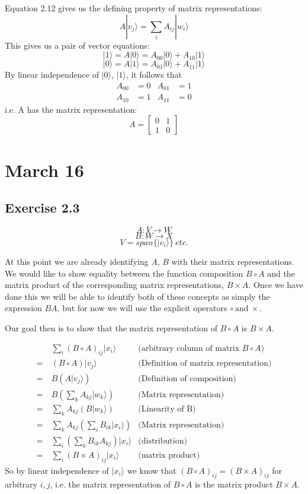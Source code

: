 \documentclass[]{article}
\begin{document}
Equation 2.12 gives us the defining property of matrix representations:
\[A|v_j\rangle=\sum_i A_{ij}|w_i\rangle\]
This gives us a pair of vector equations:
\[
|1\rangle = A|0\rangle = A_{00}|0\rangle + A_{10}|1\rangle
\]
\[
|0\rangle = A|1\rangle = A_{01}|0\rangle + A_{11}|1\rangle
\]
By linear independence of $|0\rangle$, $|1\rangle$, it follows that
\begin{align*}
A_{00} &= 0 & A_{01} &= 1 \\
A_{10} &= 1 & A_{11} &= 0
\end{align*}
i.e. A has the matrix representation:
\[
A = \left[\begin{matrix}
0 & 1 \\
1 & 0
\end{matrix}\right]
\]

\section{March 16}

\subsection{Exercise 2.3}
\[
A: V \to W
\]\[
B: W \to X
\]\[
V = span\{|v_i\rangle\}\ \textit{etc.}
\]

At this point we are already identifying $A$, $B$ with their matrix representations. We would like to show equality between the function composition $B \circ A$ and the matrix product of the corresponding matrix representations, $B \times A$.
Once we have done this we will be able to identify both of these concepts as simply the expression $BA$, but for now we will use the explicit operators
$\circ\ \text{and}\ \times$.

Our goal then is to show that the matrix representation of $B \circ A$ is $B \times A$.

\begin{align*}
&\sum_i (B \circ A)_{ij} |x_i\rangle &\text{(arbitrary column of matrix $B \circ A$)}\\
=\ &(B \circ A)|v_j\rangle &\text{(Definition of matrix representation)}\\
=\ &B(A|v_j\rangle) &\text{(Definition of composition)}\\
=\ &B\left(\sum_k A_{kj} |w_k\rangle\right) &\text{(Matrix representation)}\\
=\ &\sum_k A_{kj} (B |w_k\rangle) &\text{(Linearity of B)}\\
=\ &\sum_k A_{kj} \left( \sum_i B_{ik} |x_i\rangle \right) &\text{(Matrix representation)}\\
=\ &\sum_i \left(\sum_k B_{ik} A_{kj}\right) |x_i\rangle &\text{(distribution)}\\
=\ &\sum_i (B \times A)_{ij} |x_i\rangle &\text{(matrix product)}
\end{align*}
So by linear independence of $|x_i\rangle$ we know that $(B \circ A)_{ij} = (B \times A)_{ij}$ for arbitrary $i, j$, i.e. the matrix representation of $B \circ A$ is the matrix product $B \times A$.
\end{document}
